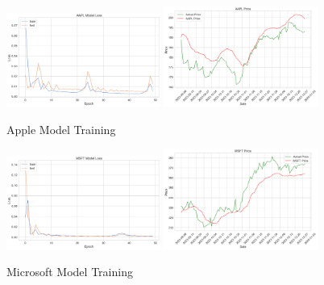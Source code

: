 \documentclass{ledger}
\begin{document}
\begin{figure}[htbp]
    \centering
    \includegraphics[width=0.45\textwidth]{code/price-prediction/lstm/images/aapl_loss.png} %
    \hspace{0.05\textwidth} %
    \includegraphics[width=0.45\textwidth]{code/price-prediction/lstm/images/aapl_price.png} %
    \caption{Apple Model Training}
    \label{fig:side_by_side}
\end{figure}

\begin{figure}[htbp]
    \centering
    \includegraphics[width=0.45\textwidth]{code/price-prediction/lstm/images/msft_loss.png} %
    \hspace{0.05\textwidth} %
    \includegraphics[width=0.45\textwidth]{code/price-prediction/lstm/images/msft_price.png} %
    \caption{Microsoft Model Training}
    \label{fig:side_by_side}
\end{figure}
\end{document}
